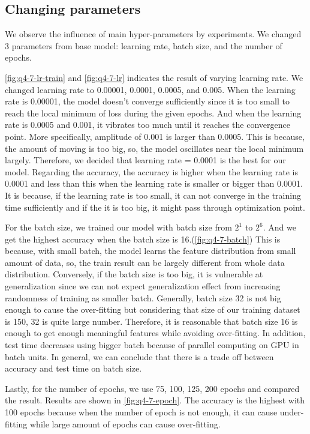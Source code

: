 \subsection{Changing parameters}
We observe the influence of main hyper-parameters by experiments. We changed 3 parameters from base model: learning rate, batch size, and the number of epochs.

\cref{fig:q4-7-lr-train} and \cref{fig:q4-7-lr} indicates the result of varying learning rate. We changed learning rate to 0.00001, 0.0001, 0.0005, and 0.005. When the learning rate is 0.00001, the model doesn't converge sufficiently since it is too small to reach the local minimum of loss during the given epochs. And when the learning rate is 0.0005 and 0.001, it vibrates too much until it reaches the convergence point. More specifically, amplitude of 0.001 is larger than 0.0005. This is because, the amount of moving is too big, so, the model oscillates near the local minimum largely. Therefore, we decided that learning rate = 0.0001 is the best for our model. Regarding the accuracy, the accuracy is higher when the learning rate is 0.0001 and less than this when the learning rate is smaller or bigger than 0.0001. It is because, if the learning rate is too small, it can not converge in the training time sufficiently and if the it is too big, it might pass through optimization point.

For the batch size, we trained our model with batch size from $2^1$ to $2^6$. And we get the highest accuracy when the batch size is 16.(\cref{fig:q4-7-batch}) This is because, with small batch, the model learns the feature distribution from small amount of data, so, the train result can be largely different from whole data distribution. Conversely, if the batch size is too big, it is vulnerable at generalization since we can not expect generalization effect from increasing randomness of training as smaller batch. Generally, batch size 32 is not big enough to cause the over-fitting but considering that size of our training dataset is 150, 32 is quite large number. Therefore, it is reasonable that batch size 16 is enough to get enough meaningful features while avoiding over-fitting. In addition, test time decreases using bigger batch because of parallel computing on GPU in batch units. In general, we can conclude that there is a trade off between accuracy and test time on batch size.

Lastly, for the number of epochs, we use 75, 100, 125, 200 epochs and compared the result. Results are shown in \cref{fig:q4-7-epoch}. The accuracy is the highest with 100 epochs because when the number of epoch is not enough, it can cause under-fitting while large amount of epochs can cause over-fitting.

